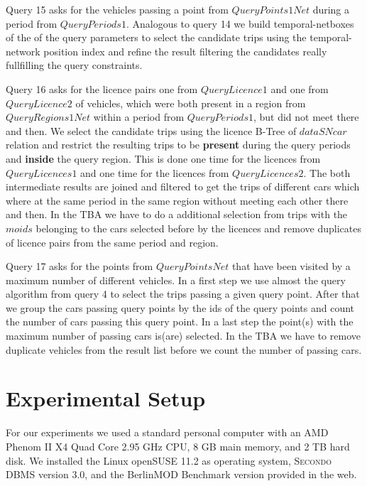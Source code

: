 \documentclass[a4paper]{article}
\newcommand{\secondo}{\textsc{Secondo}}
\newcommand{\bmodb} {BerlinMOD Benchmark}
\newcommand{\op}[1]{\textbf{#1}}
\begin{document}
Query 15 asks for the vehicles passing a point from $QueryPoints1Net$ during a period
from $QueryPeriods1$. Analogous to query 14 we build temporal-netboxes of the
of the query parameters to select the candidate trips using the temporal-network
position index and refine the result filtering the candidates really fullfilling
the query constraints.

Query 16 asks for the licence pairs one from $QueryLicence1$ and one from $QueryLicence2$
of vehicles, which were both present in a region from $QueryRegions1Net$ within a period
from $QueryPeriods1$, but did not meet there and then. We select the candidate trips
using the licence B-Tree of $dataSNcar$ relation and restrict the resulting trips to be
\op{present} during the query periods and \op{inside} the query region. This is done
one time for the licences from $QueryLicences1$ and one time for the licences from
$QueryLicences2$. The both intermediate results are joined and filtered to get the
trips of different cars which where at the same period in the same region
without meeting each other there and then. In the TBA we have
to do a additional selection from trips with the $moids$ belonging to the cars
selected before by the licences and remove duplicates of licence pairs from the
same period and region.

Query 17 asks for the points from $QueryPointsNet$ that have been visited by a
maximum number of different vehicles. In a first step we use almost the query
algorithm from query 4 to select the trips passing a given query
point. After that we group the cars passing query points by the ids of the
query points and count the number of cars passing this query point. In a last
step the point(s) with the maximum number of passing cars is(are) selected.
In the TBA we have to remove duplicate vehicles from the result list before we
count the number of passing cars.
\section{Experimental Setup}
\label{sec:scenario}
For our experiments we used a standard personal computer with an AMD Phenom II X4
Quad Core 2.95 GHz CPU, 8 GB main memory, and 2 TB hard disk. We installed the
Linux openSUSE 11.2 as operating system, \secondo{} DBMS version 3.0, and
the \bmodb{} version provided in the web.
\end{document}
